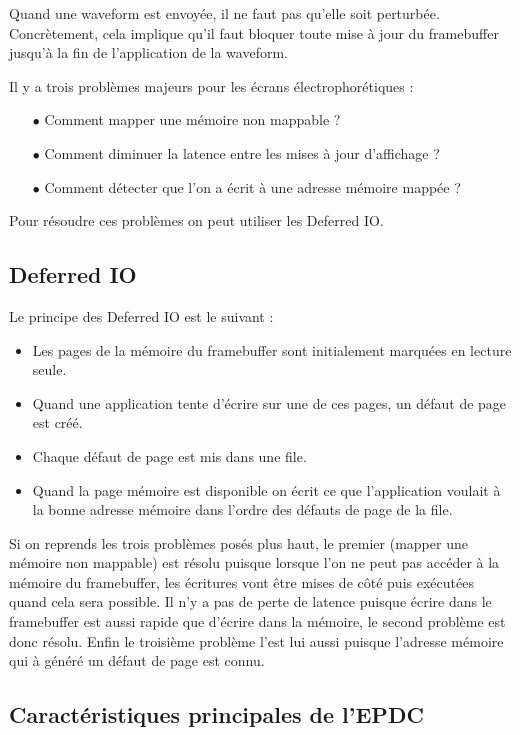 Quand une waveform est envoyée, il ne faut pas qu'elle soit perturbée. Concrètement, cela implique qu'il faut bloquer toute mise à jour du framebuffer jusqu'à la fin de l'application de la waveform.

Il y a trois problèmes majeurs pour les écrans électrophorétiques :
\begin{itemize}
	\item[$\bullet$] Comment mapper une mémoire non mappable ?
	\item[$\bullet$] Comment diminuer la latence entre les mises à jour d'affichage ?
	\item[$\bullet$] Comment détecter que l'on a écrit à une adresse mémoire mappée ?
\end{itemize}

Pour résoudre ces problèmes on peut utiliser les Deferred IO.

\newpage

\subsection{Deferred IO}

Le principe des Deferred IO est le suivant :
\begin{itemize}
\renewcommand{\labelitemi}{$\bullet$}
	\item Les pages de la mémoire du framebuffer sont initialement marquées en lecture seule.
	\item Quand une application tente d'écrire sur une de ces pages, un défaut de page est créé.
	\item Chaque défaut de page est mis dans une file.
	\item Quand la page mémoire est disponible on écrit ce que l'application voulait à la bonne adresse mémoire dans l'ordre des défauts de page de la file. 
\end{itemize} 

Si on reprends les trois problèmes posés plus haut, le premier (mapper une mémoire non mappable) est résolu puisque lorsque l'on ne peut pas accéder à la mémoire du framebuffer, les écritures vont être mises de côté puis exécutées quand cela sera possible. 
Il n'y a pas de perte de latence puisque écrire dans le framebuffer est aussi rapide que d'écrire dans la mémoire, le second problème est donc résolu.
Enfin le troisième problème l'est lui aussi puisque l'adresse mémoire qui à généré un défaut de page est connu.
\subsection{Caractéristiques principales de l'EPDC}

